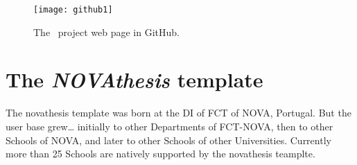 \begin{figure}[htbp]
  \centering
    \texttt{[image: github1]}
  \caption{The \novathesis\ project web page in GitHub.}
  \label{fig:github}
\end{figure}

\section{The \emph{NOVAthesis} template}
\label{sec:a_bit_of_history}

\newcommand{\mysmallcoversize}{0.09\linewidth}
\renewcommand{\theadfont}{\large\bfseries}
\newtoggle{ntRow}

\makeatletter
\newcommand{\ntSchool}[3]{%
    \setlength{\fboxsep}{0pt}%
    \def\myspace{}%
    \gape{
    \@for\listitem:=#1\do{%
      \myspace\fbox{\colorbox{White}{\texttt{[image: \\listitem]}}}%
      \def\myspace{~}%
    }}%
    &
    \parbox[c]{\linewidth}{
      \StrCut{#2}{;}\schlname\@remainder%
      \StrCut{\@remainder}{;}\schlacrn\schlurl%
      \textbf{\schlname\IfStrEq{\schlacrn}{}{}{\ \href{\schlurl}{(\schlacrn)}\newline}}
      \def\mynewline{\hspace*{2em}}\small
      \@for\listitem:=#3\do{%
        \StrCut{\listitem}{;}\schlname\@remainder%
        \StrCut{\@remainder}{;}\schlacrn\schlurl%
        \mynewline\schlname\IfStrEq{\schlacrn}{}{}{\ \href{\schlurl}{(\schlacrn)}}%
        \def\mynewline{\newline\hspace*{2em}}
    }}\\
}
\makeatother

\newenvironment{ntUniversity}[1]{
  \renewcommand\cellgape{\Gape[5pt]}
  \rowcolors{1}{}{GhostWhite}
    \xltabular{\linewidth}{cX}%
    \toprule%
    \rowcolor{Gainsboro}%
    & \Gape[1.5ex]{\thead[l]{#1}}\\
    \midrule%
}{%
    \bottomrule
    \endxltabular%
}

The \gls{novathesis} template was born at the \gls{DI} of  \gls{FCT} of \gls{NOVA}, Portugal.  But the user base grew… initially to other Departments of FCT-NOVA, then to other Schools of NOVA, and later to other Schools of other Universities.  Currently more than 25 Schools are natively supported by the \gls{novathesis} teamplte.

